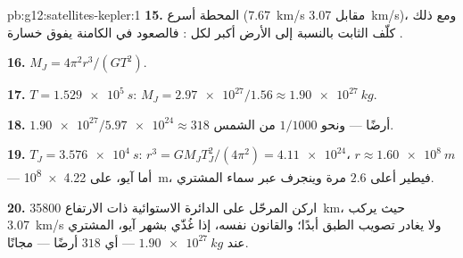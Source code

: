 \begin{solution}{pb:g12:satellites-kepler:1}
\textbf{15.} المحطة أسرع (\qty{7.67}{km/s} مقابل
\qty{3.07}{km/s})، ومع ذلك كلّف الثابت بالنسبة إلى الأرض  أكبر لكل
: فالصعود في  الكامنة يفوق خسارة .

\textbf{16.} $M_J = 4\pi^2 r^3/(G T^2)$.

\textbf{17.} $T = \qty{1.529e5}{s}$: $M_J =
\num{2.97e27}/1.56 \approx \qty{1.90e27}{kg}$.

\textbf{18.} $\num{1.90e27}/\num{5.97e24} \approx 318$ أرضًا ---
ونحو $1/1000$ من الشمس.

\textbf{19.} $T_J = \qty{3.576e4}{s}$: $r^3 = GM_J T_J^2/(4\pi^2) =
\num{4.11e24}$، $r \approx \qty{1.60e8}{m}$ --- أما آيو، على
\qty{4.22e8}{m}، فيطير أعلى $2.6$ مرة وينجرف عبر سماء
المشتري.

\textbf{20.} اركن المرحّل على الدائرة الاستوائية ذات الارتفاع
\qty{35800}{km}، حيث يركب  \qty{3.07}{km/s} ولا يغادر
تصويب الطبق أبدًا؛ والقانون نفسه، إذا غُذّي بشهر آيو،  المشتري عند
$\qty{1.90e27}{kg}$ --- أي $318$ أرضًا --- مجانًا.
\end{solution}
